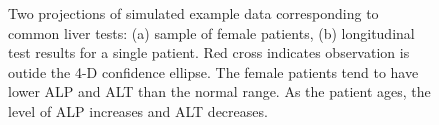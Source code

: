 \documentclass[
  12pt]{article}
\begin{document}
\begin{figure}

\begin{minipage}{0.50\linewidth}



\end{minipage}%
%
\begin{minipage}{0.50\linewidth}



\end{minipage}%

\caption{\label{fig-liver}Two projections of simulated example data
corresponding to common liver tests: (a) sample of female patients, (b)
longitudinal test results for a single patient. Red cross indicates
observation is outide the 4-D confidence ellipse. The female patients
tend to have lower ALP and ALT than the normal range. As the patient
ages, the level of ALP increases and ALT decreases.}

\end{figure}%
\end{document}
